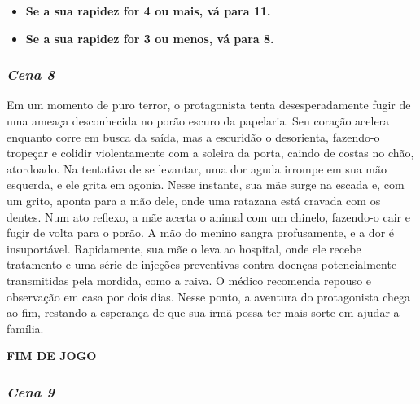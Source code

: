 \begin{itemize}
	\item \textbf{Se a sua rapidez for 4 ou mais, vá para 11.}
	\item \textbf{Se a sua rapidez for 3 ou menos, vá para 8.}
\end{itemize}


\bigskip\medskip

\subsubsection*{\textit{\textbf{Cena 8}}}

Em um momento de puro terror, o protagonista tenta desesperadamente fugir de uma ameaça desconhecida no porão escuro da papelaria. Seu coração acelera enquanto corre em busca da saída, mas a escuridão o desorienta, fazendo-o tropeçar e colidir violentamente com a soleira da porta, caindo de costas no chão, atordoado. Na tentativa de se levantar, uma dor aguda irrompe em sua mão esquerda, e ele grita em agonia. Nesse instante, sua mãe surge na escada e, com um grito, aponta para a mão dele, onde uma ratazana está cravada com os dentes. Num ato reflexo, a mãe acerta o animal com um chinelo, fazendo-o cair e fugir de volta para o porão. A mão do menino sangra profusamente, e a dor é insuportável. Rapidamente, sua mãe o leva ao hospital, onde ele recebe tratamento e uma série de injeções preventivas contra doenças potencialmente transmitidas pela mordida, como a raiva. O médico recomenda repouso e observação em casa por dois dias. Nesse ponto, a aventura do protagonista chega ao fim, restando a esperança de que sua irmã possa ter mais sorte em ajudar a família.

\textbf{FIM DE JOGO}


\bigskip\medskip

\subsubsection*{\textit{\textbf{Cena 9}}}

